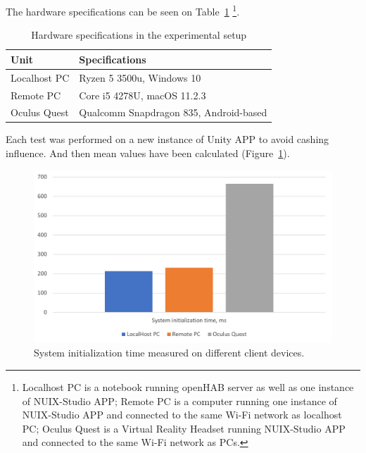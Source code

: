 The hardware specifications can be seen on Table~\ref{tab:hardware-specifications-table} \footnote{Localhost PC is a notebook running openHAB server as well as one instance of NUIX-Studio APP; Remote PC is a computer running one instance of NUIX-Studio APP and connected to the same Wi-Fi network as localhost PC; Oculus Quest is a Virtual Reality Headset running NUIX-Studio APP and connected to the same Wi-Fi network as PCs.}.

\begin{table}
  \centering
  \begin{threeparttable}[c]
    \caption{Hardware specifications in the experimental setup}
    \label{tab:hardware-specifications-table}
    \begin{tabular}{ll}
      \toprule
      Unit    &         Specifications                 \\
      \midrule
      Localhost PC & Ryzen 5 3500u, Windows 10 \\
      Remote PC & Core i5 4278U, macOS 11.2.3    \\
      Oculus Quest        & Qualcomm Snapdragon 835, Android-based            \\
      \bottomrule
    \end{tabular}
  \end{threeparttable}
\end{table}

Each test was performed on a new instance of Unity APP to avoid cashing influence. And then mean values have been calculated (Figure~\ref{fig:SystemInitTime-figure}).

\begin{figure}
  \centering
  \includegraphics[width=0.9\linewidth]{figures/SystemInitTime.png}
  \caption{System initialization time measured on different client devices.}
  \label{fig:SystemInitTime-figure}
\end{figure}

